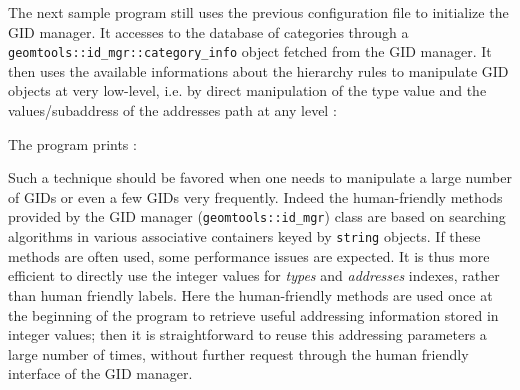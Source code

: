 \pn   The    next   sample    program   still   uses    the   previous
 configuration file to initialize the GID
manager.   It  accesses  to  the  database  of  categories  through  a
\texttt{geomtools::id\_mgr::category\_info}  object  fetched from  the
GID  manager.   It then  uses  the  available  informations about  the
hierarchy rules to manipulate GID  objects at very low-level, i.e.  by
direct manipulation of the type value and the values/subaddress of the
addresses path at  any level :


\pn The program prints :
 
\pn Such a technique should be  favored when one needs to manipulate a
large number of  GIDs or even a few GIDs  very frequently.  Indeed the
human-friendly    methods     provided    by    the     GID    manager
(\texttt{geomtools::id\_mgr}) class are  based on searching algorithms
in various associative containers keyed by \texttt{string} objects. If
these methods are often used, some performance issues are expected. It
is  thus  more  efficient  to  directly use  the  integer  values  for
\emph{types} and \emph{addresses}  indexes, rather than human friendly
labels. Here the human-friendly methods are used once at the beginning
of  the program to  retrieve useful  addressing information  stored in
integer values;  then it is  straightforward to reuse  this addressing
parameters a  large number of  times, without further  request through
the human friendly interface of the GID manager.


